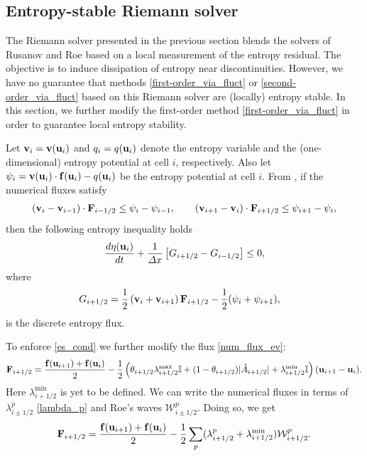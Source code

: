 \documentclass[preprint, 11pt]{article}
\newcommand{\W}{{\mathcal W}}
\newcommand{\bff}{{\bf f}}
\newcommand{\bfF}{{\bf F}}
\newcommand{\bfu}{{\bf u}}
\newcommand{\bfv}{{\bf v}}
\begin{document}
\subsection{Entropy-stable Riemann solver}\label{sec:entropy_stable}
The Riemann solver presented in the previous section blends the solvers of Rusanov and Roe based on a
local measurement of the entropy residual. The objective is to induce dissipation of entropy
near discontinuities. However, we have no guarantee that methods \eqref{first-order_via_fluct}
or \eqref{second-order_via_fluct} based on this Riemann solver are (locally) entropy stable.
In this section, we further modify the first-order method
\eqref{first-order_via_fluct} in order to guarantee local entropy stability.

Let $\bfv_i=\bfv(\bfu_i)$ and $q_i=q(\bfu_i)$ denote the entropy variable and the
(one-dimensional) entropy potential at cell $i$, respectively.
Also let $\psi_i=\bfv(\bfu_i)\cdot \bff(\bfu_i)-q(\bfu_i)$ be the entropy potential at cell $i$.
From \cite[\S 4]{tadmor1987numerical}, if the numerical fluxes satisfy
\begin{align}\label{es_cond}
(\bfv_{i}-\bfv_{i-1})\cdot \bfF_{i-1/2}\leq \psi_{i}-\psi_{i-1},
  \qquad
  (\bfv_{i+1}-\bfv_i)\cdot \bfF_{i+1/2}\leq \psi_{i+1}-\psi_i,
\end{align}
then the following entropy inequality holds
\begin{align}\label{ent_ineq}
  \frac{d\eta(\bfu_i)}{dt}+\frac{1}{\Delta x}\left[G_{i+1/2}-G_{i-1/2}\right]\leq 0,
\end{align}
where
\begin{align*}
    G_{i+1/2} &= \frac{1}{2}\left(\bfv_i+\bfv_{i+1}\right)\bfF_{i+1/2}-\frac{1}{2}(\psi_{i}+\psi_{i+1}),
\end{align*}
is the discrete entropy flux.

To enforce \eqref{es_cond} we further modify the flux \eqref{num_flux_ev}:
\begin{align*}
  \bfF_{i+1/2} = \frac{\bff(\bfu_{i+1})+\bff(\bfu_i)}{2}
  - \frac{1}{2} \left( \theta_{i+1/2}\lambda_{i+1/2}^{\max}\mathbb{I} + (1-\theta_{i+1/2})|\hat A_{i+1/2}| +\lambda_{i+1/2}^{\min}\mathbb{I}\right)(\bfu_{i+1}-\bfu_{i}).
\end{align*}
Here $\lambda_{i+1/2}^{\min}$ is yet to be defined.
We can write the numerical fluxes in terms of $\lambda^p_{i\pm 1/2}$ \eqref{lambda_p}
and Roe's waves $\W_{i\pm 1/2}^p$.
Doing so, we get
\begin{align*}
  \bfF_{i+1/2} = \frac{\bff(\bfu_{i+1})+\bff(\bfu_i)}{2}
  - \frac{1}{2}\sum_p(\lambda_{i+1/2}^p+\lambda_{i+1/2}^{\min})\W_{i+1/2}^p.
\end{align*}
\end{document}
